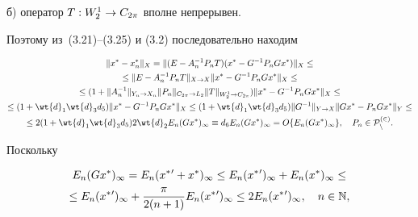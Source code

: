 б) оператор $T : W_2^1 \to C_{2\pi}$ вполне непрерывен.





\noindent{}Поэтому из~(3.21)--(3.25) и (3.2) последовательно находим


\begin{multline}


\|x^*-x_n^*\|_X =\|(E-A_n^{-1}P_nT)(x^*-G^{-1}P_nGx^*)\|_X \leq \\


%


\leq


\|E-A_n^{-1}P_nT\|_{X\rightarrow X} \|x^*-G^{-1}P_nGx^*\|_{{X}} \leq \\


%


\leq (1+\|A_n^{-1}\|_{Y_n\rightarrow X_n}


\|P_n\|_{C_{2\pi}\rightarrow L_2}


\|T\|_{W_2^1\rightarrow C_{2\pi}})


\|x^*-G^{-1}P_nGx^*\|_X\leq \\


%


\leq (1+\wt{d}_1\wt{d}_3d_5)


\|x^*-G^{-1}P_nGx^*\|_{{X}}\leq


(1+\wt{d}_1\wt{d}_3d_5)\|G^{-1}\|_{Y\rightarrow X}


\|Gx^*-P_nGx^*\|_Y\leq \\


%


\le 2 (1+\wt{d}_1\wt{d}_3d_5)


2 \wt{d}_2 E_n(Gx^*)_{\infty}\equiv


d_6 E_n(Gx^*)_{\infty}= O \{ E_n(Gx^*)_\infty


\},\quad P_n\in \rukopis{P}_n^{(2)}.


\end{multline}


Поскольку


\begin{multline*}


E_n(Gx^*)_{\infty}=E_n(x^*{}'+x^*)_{\infty}\leq E_n(x^*{}')


_{\infty}+E_n(x^*)_{\infty}\leq \\


%


\leq E_n(x^*{}')_{\infty}+\frac{\pi}{2(n+1)}E_n(x^*{}')_{\infty}


\leq 2 E_n(x^*{}')_{\infty},\quad n\in \bl{N},


\end{multline*}


